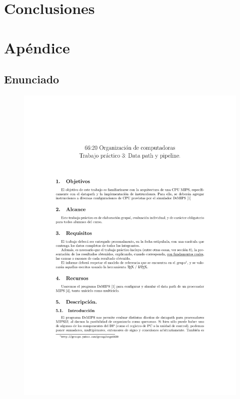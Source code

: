 \documentclass[a4paper, 12pt]{article}
\begin{document}
	
	\section{Conclusiones}
	
	\newpage
	\section{Apéndice}
	\subsection{Enunciado}

	\begin{figure}[H]
		\centering
		\includegraphics[scale=1, page = 1, clip, trim=1.5in 1.5in 20mm 2in]{files/tp3-c2-2018.pdf}
	\end{figure}
	
\end{document}
